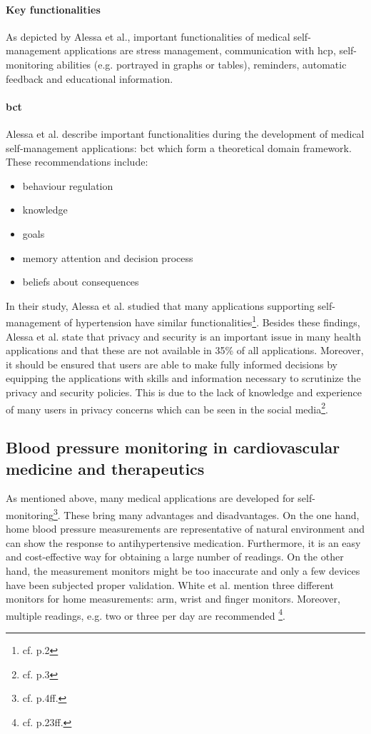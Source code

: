 \paragraph{Key functionalities}
As depicted by Alessa et al., important functionalities of medical self-management applications are stress management, communication with \ac{hcp}, self-monitoring abilities (e.g. portrayed in graphs or tables), reminders, automatic feedback and educational information.
\paragraph{\ac{bct}}
Alessa et al. describe important functionalities during the development of medical self-management applications: \ac{bct} which form a theoretical domain framework. These recommendations include:

\begin{itemize}
\setlength\itemsep{-0.5em}
  \item behaviour regulation
  \item knowledge 
  \item goals
  \item memory attention and decision process
  \item beliefs about consequences
\end{itemize}

In their study, Alessa et al. studied that many applications supporting self-management of hypertension have similar functionalities\footnote{cf.\autocite{alessa} p.2}.
Besides these findings, Alessa et al. state that privacy and security is an important issue in many health applications and that these are not available in 35\% of all applications. Moreover, it should be ensured that users are able to make fully informed decisions by equipping the applications with skills and information necessary to scrutinize the privacy and security policies. This is due to the lack of knowledge and experience of many users in privacy concerns which can be seen in the social media\footnote{cf.\autocite{alessa} p.3}.

\subsection{Blood pressure monitoring in cardiovascular medicine and therapeutics}
As mentioned above, many medical applications are developed for self-monitoring\footnote{cf. p.4ff.\autocite{white_blood_2007}}. These bring many advantages and disadvantages. On the one hand, home blood pressure measurements are representative of natural environment and can show the response to antihypertensive medication. Furthermore, it is an easy and cost-effective way for obtaining a large number of readings. 
On the other hand, the measurement monitors might be too inaccurate and only a few devices have been subjected proper validation.
White et al. mention three different monitors for home measurements: arm, wrist and finger monitors. Moreover, multiple readings, e.g. two or three per day are recommended \footnote{cf. p.23ff.\autocite{white_blood_2007}}.

